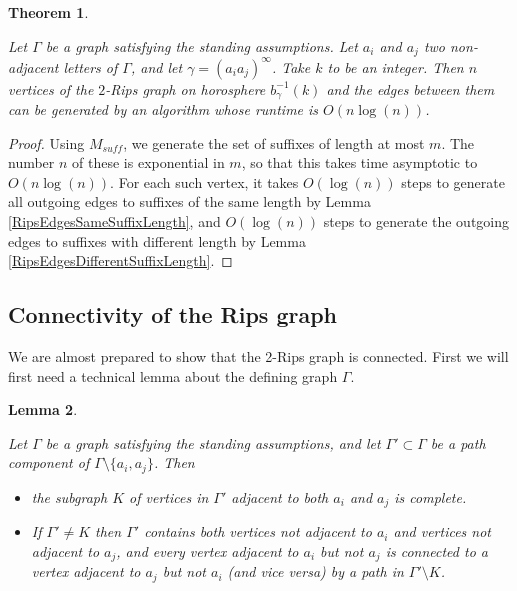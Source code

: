 \documentclass{amsart}
\newtheorem{theorem}{Theorem}[subsection]
\newtheorem{lemma}[theorem]{Lemma}
\theoremstyle{definition}
\theoremstyle{remark}
\begin{document}
	\begin{theorem} \label{RipsGraphGenerationSpeed}
		
		Let $\Gamma$ be a graph satisfying the standing assumptions. Let $a_i$ and $a_j$ two non-adjacent letters of $\Gamma$, and let $\gamma=(a_ia_j)^\infty$. Take $k$ to be an integer. Then $n$ vertices of the $2$-Rips graph on horosphere $b_\gamma^{-1}(k)$ and the edges between them can be generated by an algorithm whose runtime is $O(n\log(n))$.
		
	\end{theorem}
	
	\begin{proof}
		
		Using $M_{suff}$, we generate the set of suffixes of length at most $m$. The number $n$ of these is exponential in $m$, so that this takes time asymptotic to $O(n\log(n))$. For each such vertex, it takes $O(\log(n))$ steps to generate all outgoing edges to suffixes of the same length by Lemma \ref{RipsEdgesSameSuffixLength}, and $O(\log(n))$ steps to generate the outgoing edges to suffixes with different length by Lemma \ref{RipsEdgesDifferentSuffixLength}.
	\end{proof}
	
	
	\subsection{Connectivity of the Rips graph}
	\label{subsec:RipsConnectivity}
	
	We are almost prepared to show that the 2-Rips graph is connected. First we will first need a technical lemma about the defining graph $\Gamma$. 
	
	\begin{lemma} \label{RipsGraphTraversability}
		
		Let $\Gamma$ be a graph satisfying the standing assumptions, and let $\Gamma'\subset\Gamma$ be a path component of $\Gamma\setminus\{a_i, a_j\}$. Then
		
		\begin{itemize}
			\item the subgraph $K$ of vertices in $\Gamma'$ adjacent to both $a_i$ and $a_j$ is complete.
			
			\item If $\Gamma'\ne K$ then $\Gamma'$ contains both vertices not adjacent to $a_i$ and vertices not adjacent to $a_j$, and every vertex adjacent to $a_i$ but not $a_j$ is connected to a vertex adjacent to $a_j$ but not $a_i$ (and vice versa) by a path in $\Gamma'\setminus K$.
			
		\end{itemize}
		
	\end{lemma}
	
\end{document}
